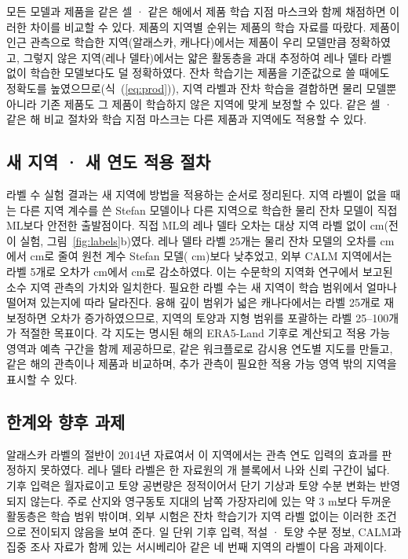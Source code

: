 모든 모델과 제품을 같은 셀 · 같은 해에서 제품 학습 지점 마스크와 함께 채점하면 이러한 차이를 비교할 수 있다. 제품의 지역별 순위는 제품의 학습 자료를 따랐다. 제품이 인근 관측으로 학습한 지역(알래스카, 캐나다)에서는 제품이 우리 모델만큼 정확하였고, 그렇지 않은 지역(레나 델타)에서는 얇은 활동층을 과대 추정하여 레나 델타 라벨 없이 학습한 모델보다도 덜 정확하였다. 잔차 학습기는 제품을 기준값으로 쓸 때에도 정확도를 높였으므로(식~(\ref{eq:prod})), 지역 라벨과 잔차 학습을 결합하면 물리 모델뿐 아니라 기존 제품도 그 제품이 학습하지 않은 지역에 맞게 보정할 수 있다. 같은 셀 · 같은 해 비교 절차와 학습 지점 마스크는 다른 제품과 지역에도 적용할 수 있다.

\subsection{새 지역 · 새 연도 적용 절차}
라벨 수 실험 결과는 새 지역에 방법을 적용하는 순서로 정리된다. 지역 라벨이 없을 때는 다른 지역 계수를 쓴 Stefan 모델이나 다른 지역으로 학습한 물리 잔차 모델이 직접 ML보다 안전한 출발점이다. 직접 ML의 레나 델타 오차는 대상 지역 라벨 없이 \ntlrmseLeDszero{} cm(전이 실험, 그림~\ref{fig:labels}b)였다. 레나 델타 라벨 25개는 물리 잔차 모델의 오차를 \ntlrmseLeRszero{} cm에서 \ntlrmseLeRstwfive{} cm로 줄여 원천 계수 Stefan 모델(\ntlrmseLePzzero{} cm)보다 낮추었고, 외부 CALM 지역에서는 라벨 5개로 오차가 \nftAllRszero{} cm에서 \nftAllRsfive{} cm로 감소하였다. 이는 수문학의 지역화 연구에서 보고된 소수 지역 관측의 가치와 일치한다\cite{Pool2019}. 필요한 라벨 수는 새 지역이 학습 범위에서 얼마나 떨어져 있는지에 따라 달라진다. 융해 깊이 범위가 넓은 캐나다에서는 라벨 25개로 재보정하면 오차가 증가하였으므로, 지역의 토양과 지형 범위를 포괄하는 라벨 25--100개가 적절한 목표이다. 각 지도는 명시된 해의 ERA5-Land 기후로 계산되고 적용 가능 영역과 예측 구간을 함께 제공하므로, 같은 워크플로로 감시용 연도별 지도를 만들고, 같은 해의 관측이나 제품과 비교하며, 추가 관측이 필요한 적용 가능 영역 밖의 지역을 표시할 수 있다.

\subsection{한계와 향후 과제}
알래스카 라벨의 절반이 2014년 자료여서 이 지역에서는 관측 연도 입력의 효과를 판정하지 못하였다. 레나 델타 라벨은 한 자료원의 \nnblkLe{}개 블록에서 나와 신뢰 구간이 넓다. 기후 입력은 월자료이고 토양 공변량은 정적이어서 단기 기상과 토양 수분 변화는 반영되지 않는다. 주로 산지와 영구동토 지대의 남쪽 가장자리에 있는 약 3 m보다 두꺼운 활동층은 학습 범위 밖이며, 외부 시험은 잔차 학습기가 지역 라벨 없이는 이러한 조건으로 전이되지 않음을 보여 준다. 일 단위 기후 입력, 적설 · 토양 수분 정보, CALM과 집중 조사 자료가 함께 있는 서시베리아 같은 네 번째 지역의 라벨이 다음 과제이다.
